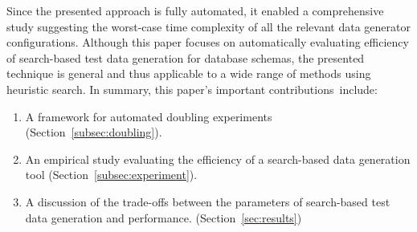 Since the presented approach is fully automated, it enabled a comprehensive study suggesting the worst-case time
complexity of all the relevant data generator configurations. Although this paper focuses on automatically evaluating
efficiency of search-based test data generation for database schemas, the presented technique is general and thus
applicable to a wide range of methods using heuristic search. In summary, this paper's important \mbox{contributions
include}:



\begin{enumerate}
  \item A framework for automated doubling experiments
    (Section~\ref{subsec:doubling}).
  \item An empirical study evaluating the efficiency of a search-based
    data generation tool (Section~\ref{subsec:experiment}).
  \item A discussion of the trade-offs between the parameters of
    search-based test data generation and performance.
    (Section~\ref{sec:results})
  \end{enumerate}
